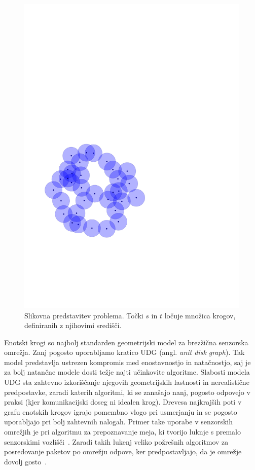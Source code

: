 \documentclass[a4paper, 12pt]{book}
\begin{document}
\begin{figure}
\centerline{\includegraphics[scale=0.6,page=4]{pics/unitdisks.pdf}}
\caption{Slikovna predstavitev problema. Točki $s$ in $t$ ločuje množica krogov, definiranih z njihovimi središči.}
\label{separation}
\end{figure}

Enotski krogi so najbolj standarden geometrijski model za brezžična senzorska omrežja. Zanj pogosto uporabljamo kratico UDG (angl. \textit{unit disk graph}). Tak model predstavlja ustrezen kompromis med enostavnostjo in natačnostjo, saj je za bolj natančne modele dosti težje najti učinkovite algoritme. Slabosti modela UDG sta zahtevno izkoriščanje njegovih geometrijskih lastnosti in nerealistične predpostavke, zaradi katerih algoritmi, ki se zanašajo nanj, pogosto odpovejo v praksi (kjer komunikacijski doseg ni idealen krog). Drevesa najkrajših poti v grafu enotskih krogov igrajo pomembno vlogo pri usmerjanju in se pogosto uporabljajo pri bolj zahtevnih nalogah. Primer take uporabe v senzorskih omrežjih je pri algoritmu za prepoznavanje meja, ki tvorijo luknje s premalo senzorskimi vozlišči~\cite{WGM06}. Zaradi takih lukenj veliko požrešnih algoritmov za posredovanje paketov po omrežju odpove, ker predpostavljajo, da je omrežje dovolj gosto~\cite{FGG06}.
\end{document}
